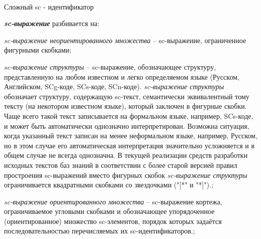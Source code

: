 \begin{frame}{\\Сложный sc - идентификатор}
	\topline
	\justifying
	\vspace*{\fill}\\
	\scriptsize{
		\textbf{\textit{sc-выражение}} разбивается на:
		\begin{textitemize}
			\item{\textit{sc-выражение неориентированного множества} -- sc-выражение, ограниченное фигурными скобками};
			\item{\textit{sc-выражение структуры} -- sc-выражение, обозначающее структуру, представленную на любом известном и легко определяемом языке (Русском, Английском, SCg-коде, SCs-коде, SCn-коде).
				\textit{sc-выражение структуры} обозначает структуру, содержащую sc-текст, семантически эквивалентный тому тексту (на некотором известном языке), который заключен в фигурные скобки. Чаще всего такой текст записывается на формальном языке, например, SCs-коде, и может быть автоматически однозначно интерпретирован. Возможна ситуация, когда указанный текст записан на менее неформальном языке, например, Русском, но в этом случае его автоматическая интерпретация значительно усложняется и в общем случае не всегда однозначна.
				В текущей реализации средств разработки исходных текстов баз знаний в соответствии с более старой версией правил простроения sc-выражений вместо фигурных скобок \textit{sc-выражение структуры} ограничивается квадратными скобками со звездочками ("[*"{} и "*]"{}).};
			\item{\textit{sc-выражение ориентированного множества} -- sc-выражение кортежа, ограничиваемое угловыми скобками и обозначающее упорядоченное (ориентированное) множество sc-элементов, порядок которых задаётся последовательностью перечисляемых их sc-идентификаторов.};	
		\end{textitemize}	
	}
\end{frame}
